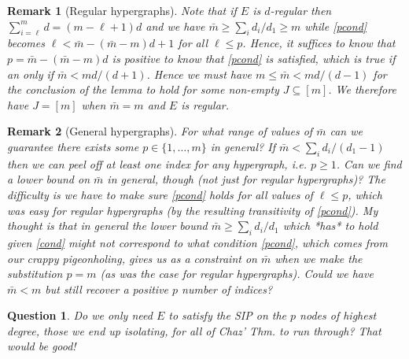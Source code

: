 \documentclass[journal, onecolumn]{IEEEtran}
\newtheorem{question}{Question}
\newtheorem{remark}{Remark}
\begin{document}
\begin{remark}[Regular hypergraphs]
Note that if $E$ is $d$-regular then $\sum_{i=\ell}^m d = (m-\ell+1) d$ and we have $\bar m \geq \sum_i d_i / d_1 \geq m$ while \eqref{pcond} becomes $\ell < \bar m - (\bar m - m) d + 1$ for all $\ell \leq p$. Hence, it suffices to know that $p = \bar m - (\bar m - m) d$ is positive to know that \eqref{pcond} is satisfied, which is true if an only if $\bar m < md / (d+1)$. Hence we must have $m \leq \bar m < md / (d-1)$ for the conclusion of the lemma to hold for some non-empty $J \subseteq [m]$. We therefore have $J = [m]$ when $\bar m = m$ and $E$ is regular. 
\end{remark}

\begin{remark}[General hypergraphs]
For what range of values of $\bar m$ can we guarantee there exists some $p \in \{1, \ldots, m\}$ in general? If $\bar m < \sum_i d_i / (d_1-1)$ then we can peel off at least one index for any hypergraph, i.e. $p \geq 1$. Can we find a lower bound on $\bar m$ in general, though (not just for regular hypergraphs)? The difficulty is we have to make sure \eqref{pcond} holds for \emph{all} values of $\ell \leq p$, which was easy for regular hypergraphs (by the resulting transitivity of \eqref{pcond}). My thought is that in general the lower bound $\bar m \geq \sum_i d_i / d_1$ which *has* to hold given \eqref{cond} might not correspond to what condition \eqref{pcond}, which comes from our crappy pigeonholing, gives us as a constraint on $\bar m$ when we make the substitution $p=m$ (as was the case for regular hypergraphs). Could we have $\bar m < m$ but still recover a positive $p$ number of indices?
\end{remark}

\begin{question}
Do we only need $E$ to satisfy the SIP on the $p$ nodes of highest degree, those we end up isolating, for all of Chaz' Thm. to run through? That would be good!
\end{question}
\end{document}
